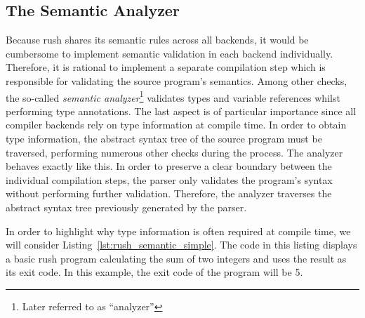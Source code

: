 \subsection{The Semantic Analyzer}
Because rush shares its semantic rules across all backends,
it would be cumbersome to implement semantic validation in each
backend individually. Therefore, it is rational to implement a separate
compilation step which is responsible for validating the source program's semantics.
Among other checks, the so-called \emph{semantic analyzer}\footnote{Later referred to as \enquote{analyzer}} validates types
and variable references whilst performing type annotations. The last aspect is
of particular importance since all compiler backends rely on type information at
compile time. In order to obtain type information, the abstract syntax
tree of the source program must be traversed, performing numerous other checks
during the process. The analyzer behaves exactly like this. In order to
preserve a clear boundary between the individual compilation steps, the parser
only validates the program's syntax without performing further validation.
Therefore, the analyzer traverses the abstract syntax tree previously generated
by the parser.

In order to highlight why type information is often required at compile time, we will consider Listing~\ref{lst:rush_semantic_simple}.
The code in this listing displays a basic rush program calculating the sum of two integers and uses the result as its exit code.
In this example, the exit code of the program will be 5.


